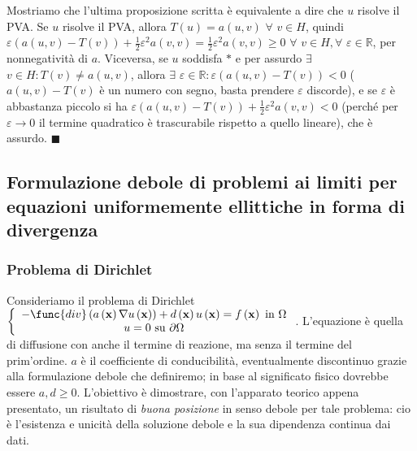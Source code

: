 \documentclass{article}
\begin{document}
Mostriamo che l'ultima proposizione scritta \`{e} equivalente a dire che $u$
risolve il PVA. Se $u$ risolve il PVA, allora $T\left( u\right) =a\left(
u,v\right) $ $\forall $ $v\in H$, quindi $\varepsilon \left( a\left(
u,v\right) -T\left( v\right) \right) +\frac{1}{2}\varepsilon ^{2}a\left(
v,v\right) =\frac{1}{2}\varepsilon ^{2}a\left( v,v\right) \geq 0$ $\forall $ 
$v\in H,\forall $ $\varepsilon \in 
\mathbb{R}
$, per nonnegativit\`{a} di $a$. Viceversa, se $u$ soddisfa $\ast $ e per
assurdo $\exists $ $v\in H:T\left( v\right) \neq a\left( u,v\right) $,
allora $\exists $ $\varepsilon \in 
\mathbb{R}
:\varepsilon \left( a\left( u,v\right) -T\left( v\right) \right) <0$ ($%
a\left( u,v\right) -T\left( v\right) $ \`{e} un numero con segno, basta
prendere $\varepsilon $ discorde), e se $\varepsilon $ \`{e} abbastanza
piccolo si ha $\varepsilon \left( a\left( u,v\right) -T\left( v\right)
\right) +\frac{1}{2}\varepsilon ^{2}a\left( v,v\right) <0$ (perch\'{e} per $%
\varepsilon \rightarrow 0$ il termine quadratico \`{e} trascurabile rispetto
a quello lineare), che \`{e} assurdo. $\blacksquare $

\subsection{Formulazione debole di problemi ai limiti per equazioni
uniformemente ellittiche in forma di divergenza}

\subsubsection{Problema di Dirichlet}

Consideriamo il problema di Dirichlet $\left\{ 
\begin{array}{c}
-\func{div}\left( a\left( \mathbf{x}\right) \nabla u\left( \mathbf{x}\right)
\right) +d\left( \mathbf{x}\right) u\left( \mathbf{x}\right) =f\left( 
\mathbf{x}\right) \text{ in }\Omega \\ 
u=0\text{ su }\partial \Omega%
\end{array}%
\right. $. L'equazione \`{e} quella di diffusione con anche il termine di
reazione, ma senza il termine del prim'ordine. $a$ \`{e} il coefficiente di
conducibilit\`{a}, eventualmente discontinuo grazie alla formulazione debole
che definiremo; in base al significato fisico dovrebbe essere $a,d\geq 0$.
L'obiettivo \`{e} dimostrare, con l'apparato teorico appena presentato, un
risultato di \textit{buona posizione} in senso debole per tale problema: cio%
\`{e} l'esistenza e unicit\`{a} della soluzione debole e la sua dipendenza
continua dai dati.
\end{document}
